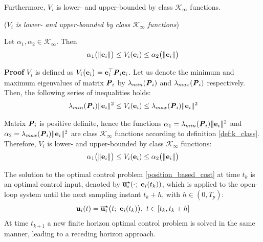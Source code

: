 Furthermore, $V_i$ is lower- and upper-bounded by class $\mathcal{K}_{\infty}$ functions.

\begin{bw_box}
  \begin{lemma} (\textit{$V_i$ is lower- and upper-bounded by class
      \label{lemma:V_i_lower_upper_bounded}
    $\mathcal{K}_{\infty}$ functions})
  \end{lemma}

  Let $\alpha_1, \alpha_2 \in \mathcal{K}_{\infty}$. Then
  \begin{align}
    \alpha_1\big(\|\bm{\mathbf{e}}_i\|\big) \leq V_i(\bm{\mathbf{e}}_i) \leq \alpha_2\big(\| \bm{\mathbf{e}}_i \|\big)
  \end{align}

\end{bw_box}

\begin{gg_box}
  \textbf{Proof}
  $V_i$ is defined as
  $V_i\big(\bm{\mathbf{e}}_i\big) = \bm{\mathbf{e}}_i^{\top} \bm{\mathit{P}}_i \bm{\mathbf{e}}_i$.
  Let us denote the minimum and maximum eigenvalues of matrix $\bm{\mathit{P}}_i$ by
  $\lambda_{min}(\bm{\mathit{P}}_i)$ and $\lambda_{max}(\bm{\mathit{P}}_i)$ respectively.
  Then, the following series of inequalities holds:
\begin{align}
  \lambda_{min}(\bm{\mathit{P}}_i) \|\bm{\mathbf{e}}_i\|^2 \leq V_i(\bm{\mathbf{e}}_i) \leq \lambda_{max}(\bm{\mathit{P}}_i) \|\bm{\mathbf{e}}_i\|^2
\end{align}

Matrix $\bm{\mathit{P}}_i$ is positive definite, hence the functions
$\alpha_1 = \lambda_{min}(\bm{\mathit{P}}_i) \|\bm{\mathbf{e}}_i\|^2$ and
$\alpha_2 = \lambda_{max}(\bm{\mathit{P}}_i) \|\bm{\mathbf{e}}_i\|^2$ are
class $\mathcal{K}_{\infty}$ functions according to definition \eqref{def:k_class}.
Therefore, $V_i$ is lower- and upper-bounded by class $\mathcal{K}_{\infty}$
functions:
\begin{align}
  \alpha_1\big(\|\bm{\mathbf{e}}_i\|\big) \leq V_i(\bm{\mathbf{e}}_i) \leq \alpha_2\big(\| \bm{\mathbf{e}}_i \|\big)
\end{align}
\qedsymbol
\end{gg_box}


The solution to the optimal control problem \eqref{position_based_cost}
at time $t_k$ is an optimal control input, denoted by
$\overline{\bm{\mathbf{u}}}_i^{\star}(\cdot;\ \bm{\mathbf{e}}_i(t_k))$, which
is applied to the open-loop system until the next sampling instant $t_k + h$,
with $h \in (0,T_p)$:
\begin{align}
  \bm{\mathbf{u}}_i(t) = \overline{\bm{\mathbf{u}}}_i^{\star}\big(t;\ \bm{\mathbf{e}}_i(t_k)\big),\  t \in [t_k, t_k + h]
 \label{eq:position_based_optimal_u}
\end{align}
At time $t_{k+1}$ a new finite horizon optimal control problem is solved in the
same manner, leading to a receding horizon approach.

